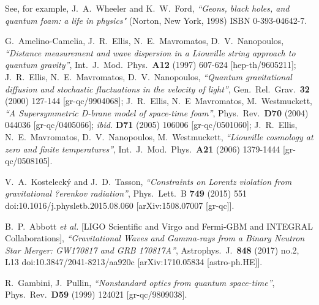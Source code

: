 \documentclass[12pt]{article}
\begin{document}
{%

\begin{thebibliography}{99}

 See, for example,  J.~A.~Wheeler and K.~W.~Ford, {\it ``Geons, black holes, and quantum foam: a life in physics"}
 (Norton, New York, 1998) ISBN 0-393-04642-7.

 G.~Amelino-Camelia, J.~R.~Ellis, N.~E.~Mavromatos, D.~V.~Nanopoulos,
{\it ``Distance measurement and wave dispersion in a Liouville string approach to quantum gravity''},
  Int.\ J.\ Mod.\ Phys.\  {\bf A12 } (1997)  607-624
  [hep-th/9605211];
J.~R.~Ellis, N.~E.~Mavromatos, D.~V.~Nanopoulos,
{\it ``Quantum gravitational diffusion and stochastic fluctuations in the velocity of light''},
  Gen.\ Rel.\ Grav.\  {\bf 32 } (2000)  127-144
  [gr-qc/9904068];
J.~R.~Ellis, N.~E~Mavromatos, M.~Westmuckett,
 {\it ``A Supersymmetric D-brane model of space-time foam''},
  Phys.\ Rev.\  {\bf D70 } (2004)  044036
  [gr-qc/0405066];
  \emph{ibid.} {\bf D71 } (2005)  106006
  [gr-qc/0501060];
   J.~R.~Ellis, N.~E.~Mavromatos, D.~V.~Nanopoulos, M.~Westmuckett,
 {\it ``Liouville cosmology at zero and finite temperatures''},
  Int.\ J.\ Mod.\ Phys.\  {\bf A21 } (2006)  1379-1444
  [gr-qc/0508105].

  V.~A.~Kosteleck{\' y} and J.~D.~Tasson,
{\it ``Constraints on Lorentz violation from gravitational ?erenkov radiation''},
  Phys.\ Lett.\ B {\bf 749} (2015) 551
  doi:10.1016/j.physletb.2015.08.060
  [arXiv:1508.07007 [gr-qc]].

  B.~P.~Abbott {\it et al.} [LIGO Scientific and Virgo and Fermi-GBM and INTEGRAL Collaborations],
  {\it ``Gravitational Waves and Gamma-rays from a Binary Neutron Star Merger: GW170817 and GRB 170817A''},
  Astrophys.\ J.\  {\bf 848} (2017) no.2,  L13
  doi:10.3847/2041-8213/aa920c
  [arXiv:1710.05834 [astro-ph.HE]].

   R.~Gambini, J.~Pullin,
  {\it ``Nonstandard optics from quantum space-time''},
  Phys.\ Rev.\  {\bf D59 } (1999)  124021
  [gr-qc/9809038].


\end{thebibliography}}
\end{document}
